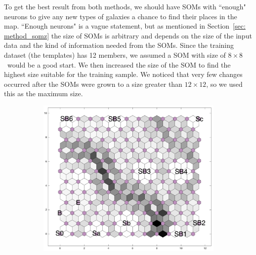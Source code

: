     To get the best result from both methods, we should have SOMs with ``enough"  neurons to give any new types of galaxies a chance to find their places in the map.
    ``Enough neurons" is a vague statement, but as mentioned in Section~\ref{sec: method_somz} the size of SOMs is arbitrary and depends on the size of the input data and the kind of information needed from the SOMs.
    Since the training dataset (the  templates) has 12 members, we assumed a SOM with size of $8\times8$~would be a good start.
    We then increased the size of the SOM to find the highest size suitable for the training sample.
    We noticed that very few changes occurred after the SOMs were grown to a size greater than $12\times12$, so we used this as the maximum size.
    
    \begin{figure}
        \begin{subfigure}[b]{0.45\textwidth}
            \centering
            \includegraphics[width=\textwidth]{images0.01/2d/dist_12_by_12.png}
        \end{subfigure}
        \hfill
        \begin{subfigure}[b]{0.45\textwidth}
            \centering

\end{subfigure}
\end{figure}
